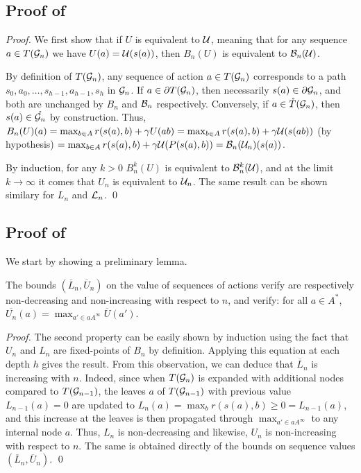 \documentclass[runningheads]{llncs}
\begin{document}
\subsection{Proof of }
\begin{proof}
	
We first show that if $U$ is equivalent to $\mathcal{U}$, meaning that for any sequence $a\in T(\mathcal{G}_n)$ we have $U(a) = \mathcal{U}(s(a))$, then $B_n(U)$ is equivalent to $\mathcal{B}_n(\mathcal{U})$.

By definition of $T(\mathcal{G}_n)$, any sequence of action $a\in T(\mathcal{G}_n)$ corresponds to a path $s_0, a_0,\dots, s_{h-1}, a_{h-1}, s_{h}$ in $\mathcal{G}_n$. If $a\in{\partial T(\mathcal{G}_n)}$, then necessarily $s(a)\in{\partial \mathcal{G}_n}$, and both are unchanged by $B_n$ and $\mathcal{B}_n$ respectively. Conversely, if $a\in\mathring{T}(\mathcal{G}_n)$, then $s(a)\in\mathring{\mathcal{G}_n}$ by construction. Thus, $B_n(U)(a) = \max_{b\in A} r(s(a), b) + \gamma U({ab}) = \max_{b\in A} r(s(a), b) + \gamma \mathcal{U}(s({ab}))$ (by hypothesis) $= \max_{b\in A} r(s(a), b) + \gamma \mathcal{U}(P(s({a}),b)) = \mathcal{B}_n(\mathcal{U}_n)(s(a))$.

By induction, for any $k>0$ $B_n^k(U)$ is equivalent to $\mathcal{B}_n^k(\mathcal{U})$, and at the limit $k\rightarrow\infty$ it comes that $U_n$ is equivalent to $\mathcal{U}_n$. The same result can be shown similary for $L_n$ and $\mathcal{L}_n$.
\qed\end{proof}

\subsection{Proof of }

We start by showing a preliminary lemma.
\begin{lemma}
	\label{lem:bounds}
	The bounds $(\overline{L}_n, \overline{U}_n)$ on the value of sequences of actions verify are respectively non-decreasing and non-increasing with respect to $n$, and verify: for all $a\in A^*$, $\overline{U_n}(a) = \max_{a'\in a A^\infty} \overline{U}(a')$.
\end{lemma}
\begin{proof}
	The second property can be easily shown by induction using the fact that $U_n$ and $L_n$ are fixed-points of $B_n$ by definition. Applying this equation at each depth $h$ gives the result. From this observation, we can deduce that $\overline{L}_n$ is increasing with $n$. Indeed, since when $T(\mathcal{G}_n)$ is expanded with additional nodes compared to $T(\mathcal{G}_{n-1})$, the leaves $a$ of $T(\mathcal{G}_{n-1})$ with previous value $L_{n-1}(a)=0$ are updated to $L_n(a) = \max_b r(s(a), b) \geq 0 = L_{n-1}(a)$, and this increase at the leaves is then propagated through $\max_{a'\in a A^\infty}$ to any internal node $a$. Thus, $L_n$ is non-decreasing and likewise, $U_n$ is non-increasing with respect to $n$. The same is obtained directly of the bounds on sequence values $(\overline{L}_n, \overline{U}_n)$.
\qed\end{proof}
\end{document}
